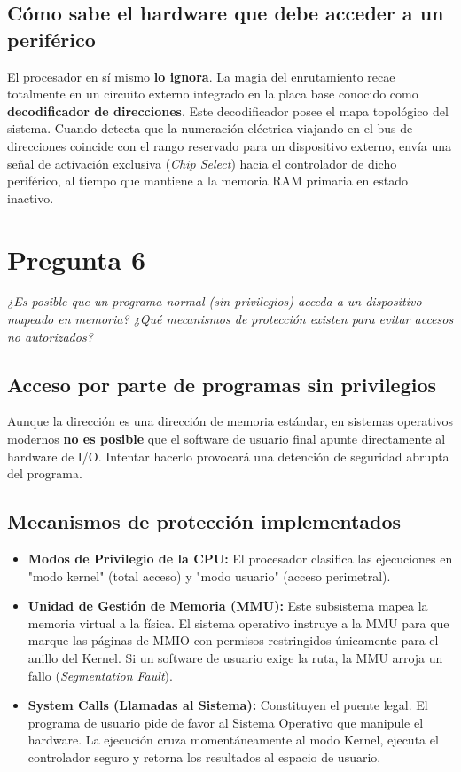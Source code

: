 \documentclass[12pt,a4paper]{article}
\begin{document}
	\subsection{Cómo sabe el hardware que debe acceder a un periférico}
	El procesador en sí mismo \textbf{lo ignora}. La magia del enrutamiento recae totalmente en un circuito externo integrado en la placa base conocido como \textbf{decodificador de direcciones}. Este decodificador posee el mapa topológico del sistema. Cuando detecta que la numeración eléctrica viajando en el bus de direcciones coincide con el rango reservado para un dispositivo externo, envía una señal de activación exclusiva (\textit{Chip Select}) hacia el controlador de dicho periférico, al tiempo que mantiene a la memoria RAM primaria en estado inactivo.
	
	\section{Pregunta 6}
	\textit{¿Es posible que un programa normal (sin privilegios) acceda a un dispositivo mapeado en memoria? ¿Qué mecanismos de protección existen para evitar accesos no autorizados?}
	
	\subsection{Acceso por parte de programas sin privilegios}
	Aunque la dirección es una dirección de memoria estándar, en sistemas operativos modernos \textbf{no es posible} que el software de usuario final apunte directamente al hardware de I/O. Intentar hacerlo provocará una detención de seguridad abrupta del programa.
	
	\subsection{Mecanismos de protección implementados}
	\begin{itemize}
		\item \textbf{Modos de Privilegio de la CPU:} El procesador clasifica las ejecuciones en "modo kernel" (total acceso) y "modo usuario" (acceso perimetral).
		\item \textbf{Unidad de Gestión de Memoria (MMU):} Este subsistema mapea la memoria virtual a la física. El sistema operativo instruye a la MMU para que marque las páginas de MMIO con permisos restringidos únicamente para el anillo del Kernel. Si un software de usuario exige la ruta, la MMU arroja un fallo (\textit{Segmentation Fault}).
		\item \textbf{System Calls (Llamadas al Sistema):} Constituyen el puente legal. El programa de usuario pide de favor al Sistema Operativo que manipule el hardware. La ejecución cruza momentáneamente al modo Kernel, ejecuta el controlador seguro y retorna los resultados al espacio de usuario.
	\end{itemize}
	
\end{document}
